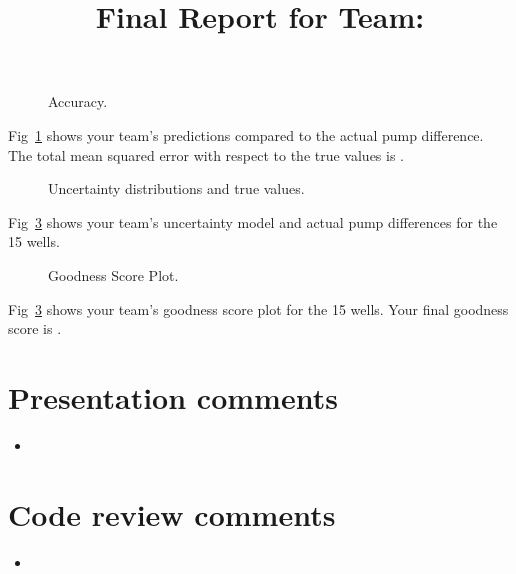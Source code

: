 \documentclass[11pt, oneside]{article}   	%
\title{Final Report for Team: \VAR{teamname}}
\date{}
\begin{document}
\maketitle

\begin{figure}[htbp] %
   \centering
   \scalebox{0.75}{}
   \caption{Accuracy.}
   \label{fig:accuracy}
\end{figure}
%
Fig~\ref{fig:accuracy} shows your team's predictions compared to the actual pump difference.  The total mean squared error with respect to the true values is .

\newpage

\begin{figure}[tbph] %
   \centering
   \scalebox{0.55}{}
   \caption{Uncertainty distributions and true values.}
   \label{fig:realizations}
\end{figure}
%
Fig~\ref{fig:realizations} shows your team's uncertainty model and actual pump differences for the 15 wells.

\newpage

\begin{figure}[tbph] %
   \centering
   \scalebox{0.7}{}
   \caption{Goodness Score Plot.}
   \label{fig:realizations}
\end{figure}
%
Fig~\ref{fig:realizations} shows your team's goodness score plot for the 15 wells.  Your final goodness score is .

\newpage

\section*{Presentation comments}
\begin{itemize}
  \item {}
\end{itemize}

\section*{Code review comments}
\begin{itemize}
  \item {}
\end{itemize}
\end{document}
